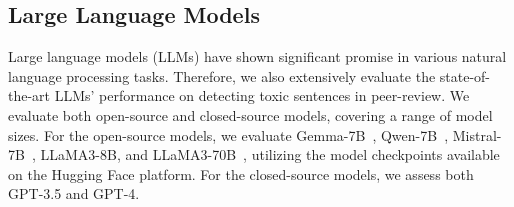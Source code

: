 \subsection{Large Language Models} 
Large language models (LLMs) have shown significant promise in various natural language processing tasks. 
Therefore, we also extensively evaluate the state-of-the-art LLMs' performance on detecting toxic sentences in peer-review. We evaluate both open-source and closed-source models, covering a range of model sizes. For the open-source models, we evaluate Gemma-7B~\cite{team2024gemma}, Qwen-7B~\cite{bai2023qwen}, Mistral-7B~\cite{jiang2023mistral}, LLaMA3-8B, and LLaMA3-70B~\cite{touvron2023llama}, utilizing the model checkpoints available on the Hugging Face platform. For the closed-source models, we assess both GPT-3.5 and GPT-4.




